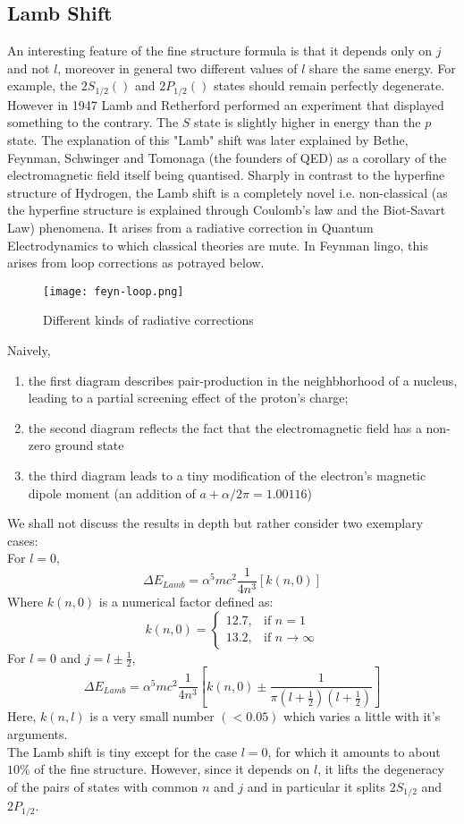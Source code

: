 \subsection{Lamb Shift}
An interesting feature of the fine structure formula is that it depends only on $j$ and not $l$, moreover in general two different values of $l$ share the same energy. For example, the $2S_{1/2} ()$ and $2P_{1/2} ()$ states should remain perfectly degenerate. However in 1947 Lamb and Retherford performed an experiment that displayed something to the contrary. The $S$ state is slightly higher in energy than the $p$ state. The explanation of this "Lamb" shift was later explained by Bethe, Feynman, Schwinger and Tomonaga (the founders of QED) as a corollary of the electromagnetic field itself being quantised.  Sharply in contrast to the hyperfine structure of Hydrogen, the Lamb shift is a completely novel i.e. non-classical (as the hyperfine structure is explained through Coulomb's law and the Biot-Savart Law) phenomena. It arises from a radiative correction in Quantum Electrodynamics to which classical theories are mute. In Feynman lingo, this arises from loop corrections as potrayed below.
\begin{figure}[h]
	\centering
	\texttt{[image: feyn-loop.png]}
	\caption{Different kinds of radiative corrections}
\end{figure}
Naively,
\begin{enumerate}
	\item the first diagram describes pair-production in the neighbhorhood of a nucleus, leading to a partial screening effect of the proton's charge;
	\item the second diagram reflects the fact that the electromagnetic field has a non-zero ground state
	\item the third diagram leads to a tiny modification of the electron's magnetic dipole moment (an addition of $a + \alpha/2\pi = 1.00116$)
\end{enumerate}
We shall not discuss the results in depth but rather consider two exemplary cases:\\
For $ l = 0$,
\begin{equation}
\Delta E_{Lamb} = \alpha^{5}mc^{2}\frac{1}{4n^{3}}\left[k(n,0)\right]
\end{equation}
Where $k(n,0)$ is a numerical factor defined as:
$$k(n,0) = \begin{cases}
12.7, & \text{if } n = 1\\
13.2,              & \text{if } n \rightarrow \infty
\end{cases} $$
For $ l = 0$ and $j = l \pm \frac{1}{2}$,
\begin{equation}
\Delta E_{Lamb} = \alpha^{5}mc^{2}\frac{1}{4n^{3}}\left[ k(n,0) \pm \frac{1}{\pi (l + \frac{1}{2}) (l + \frac{1}{2})} \right]
\end{equation}
Here, $k(n,l)$ is a very small number $(< 0.05)$ which varies a little with it's arguments.\\
The Lamb shift is tiny except for the case $l=0$, for which it amounts to about $10 \% $ of the fine structure. However, since it depends on $l$, it lifts the degeneracy of the pairs of states with common $n$ and $j$ and in particular it splits $2 S_{1/2}$ and $2 P_{1/2}$.
